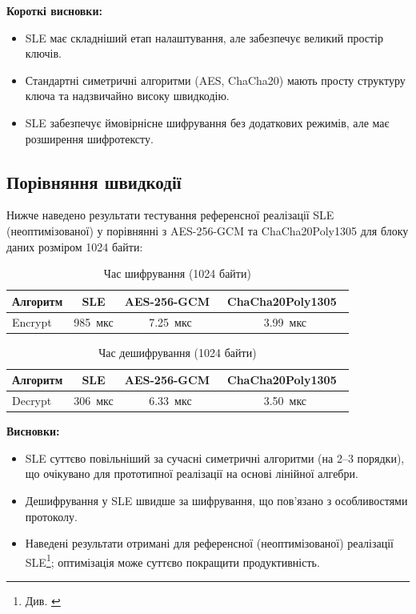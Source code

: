 \textbf{Короткі висновки:}
\begin{itemize}
    \item SLE має складніший етап налаштування, але забезпечує великий простір ключів.
    \item Стандартні симетричні алгоритми (AES, ChaCha20) мають просту структуру ключа та надзвичайно високу швидкодію.
    \item SLE забезпечує ймовірнісне шифрування без додаткових режимів, але має розширення шифротексту.
\end{itemize}

\subsection{Порівняння швидкодії}

Нижче наведено результати тестування референсної реалізації SLE (неоптимізованої) у порівнянні з AES-256-GCM та ChaCha20Poly1305 для блоку даних розміром 1024 байти:

\begin{table}[h!]
\centering
\begin{tabular}{|l|c|c|c|}
\hline
\textbf{Алгоритм} & \textbf{SLE} & \textbf{AES-256-GCM}~\cite{NISTSP800-38D, RustCryptoAESGCMDocs} & \textbf{ChaCha20Poly1305}~\cite{RFC8439, RustCryptoChaChaPoly1305Docs} \\
\hline
Encrypt & 985~мкс & 7.25~мкс & 3.99~мкс \\
\hline
\end{tabular}
\caption{Час шифрування (1024 байти)}
\label{tab:table3}
\end{table}

\begin{table}[h!]
\centering
\begin{tabular}{|l|c|c|c|}
\hline
\textbf{Алгоритм} & \textbf{SLE} & \textbf{AES-256-GCM}~\cite{NISTSP800-38D, RustCryptoAESGCMDocs} & \textbf{ChaCha20Poly1305}~\cite{RFC8439, RustCryptoChaChaPoly1305Docs} \\
\hline
Decrypt & 306~мкс & 6.33~мкс & 3.50~мкс \\
\hline
\end{tabular}
\caption{Час дешифрування (1024 байти)}
\label{tab:table4}
\end{table}

\textbf{Висновки:}
\begin{itemize}
    \item SLE суттєво повільніший за сучасні симетричні алгоритми (на 2--3 порядки), що очікувано для прототипної реалізації на основі лінійної алгебри.
    \item Дешифрування у SLE швидше за шифрування, що пов'язано з особливостями протоколу.
    \item Наведені результати отримані для референсної (неоптимізованої) реалізації SLE\footnote{Див. \cite{KyrylR24SLE}}; оптимізація може суттєво покращити продуктивність.
\end{itemize}

